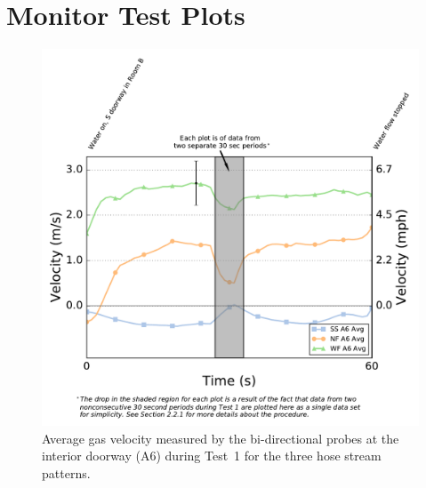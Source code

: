 \documentclass[12pt,oneside]{book}
\begin{document}
\clearpage

\chapter{Monitor Test Plots}
\label{chap:monitor_plots}

\begin{figure}[!ht]
	\includegraphics[width=\columnwidth]{../Figures/Plots/HOSE_IXXAXX_BDP_A6_stream_avgs}
	\caption[Average gas velocity through the interior doorway during Test~1 for the three hose stream patterns.]{Average gas velocity measured by the bi-directional probes at the interior doorway (A6) during Test~1 for the three hose stream patterns.}
	\label{fig:Test_1_BDP_A6_Avg_All}
\end{figure}
\FloatBarrier
\end{document}
